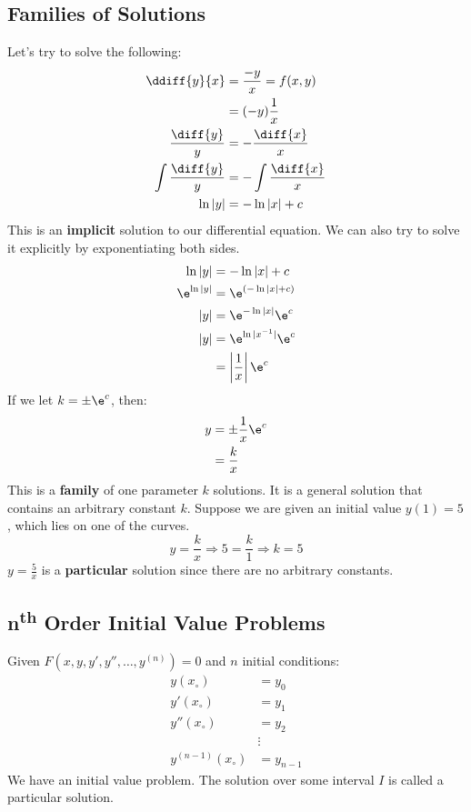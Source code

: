 \documentclass{math}
\begin{document}
\subsection*{Families of Solutions}
Let's try to solve the following:
\begin{align*}
  \ddiff{y}{x} &= \frac{-y}{x} = f(x,y) \\
  &= (-y)\frac{1}{x} \\
  \frac{\diff{y}}{y} &= -\frac{\diff{x}}{x} \\
  \int\frac{\diff{y}}{y} &= -\int\frac{\diff{x}}{x} \\
  \ln|y| &= -\ln|x|+c
\end{align*}
This is an \textbf{implicit} solution to our differential equation. We can also
try to solve it explicitly by exponentiating both sides.
\begin{align*}
  \ln|y| &= -\ln|x|+c \\
  \e^{\ln|y|} &= \e^{(-\ln|x|+c)} \\
  |y| &= \e^{-\ln|x|}\e^c \\
  |y| &= \e^{\ln|x^{-1}|}\e^c \\
  &= \left|\frac{1}{x}\right|\e^c
\end{align*}
If we let \( k = \pm\e^c \), then:
\begin{align*}
  y &= \pm\frac{1}{x}\e^c \\
  &= \frac{k}{x}
\end{align*}
This is a \textbf{family} of one parameter \( k \) solutions. It is a general
solution that contains an arbitrary constant \( k \). Suppose we are given an
initial value \( y(1) = 5 \), which lies on one of the curves.
\[ y = \frac{k}{x} \Longrightarrow 5 = \frac{k}{1} \Longrightarrow k = 5 \]
\( y = \frac{5}{x} \) is a \textbf{particular} solution since there are no
arbitrary constants.

\subsection*{n\textsuperscript{th} Order Initial Value Problems}
Given \( F(x,y,y',y'',\dots,y^{(n)}) = 0 \) and \( n \) initial conditions:
\begin{align*}
  y(x_{\circ}) &= y_0 \\
  y'(x_{\circ}) &= y_1 \\
  y''(x_{\circ}) &= y_2 \\
  & \vdots \\
  y^{(n-1)}(x_{\circ}) &= y_{n-1}
\end{align*}
We have an initial value problem. The solution over some interval \( I \) is
called a particular solution.
\end{document}
